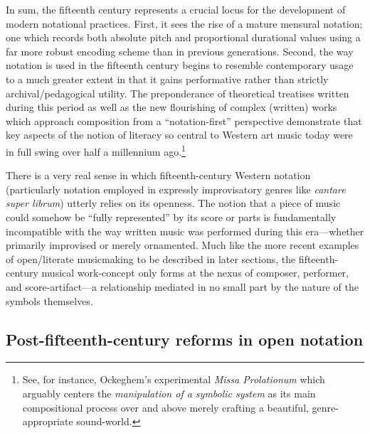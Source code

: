     In sum, the fifteenth century represents a crucial locus for the development of modern notational practices. First, it sees the rise of a mature mensural notation; one which records both absolute pitch and proportional durational values using a far more robust encoding scheme than in previous generations. Second, the way notation is used in the fifteenth century begins to resemble contemporary usage to a much greater extent in that it gains performative rather than strictly archival/pedagogical utility. The preponderance of theoretical treatises written during this period as well as the new flourishing of complex (written) works which approach composition from a ``notation-first'' perspective demonstrate that key aspects of the notion of literacy so central to Western art music today were in full swing over half a millennium ago.\footnote{See, for instance, Ockeghem's experimental \textit{Missa Prolationum} which arguably centers the \textit{manipulation of a symbolic system} as its main compositional process over and above merely crafting a beautiful, genre-appropriate sound-world.} 

    There is a very real sense in which fifteenth-century Western notation (particularly notation employed in expressly improvisatory genres like \textit{cantare super librum}) utterly relies on its openness. The notion that a piece of music could somehow be ``fully represented'' by its score or parts is fundamentally incompatible with the way written music was performed during this era---whether primarily improvised or merely ornamented. Much like the more recent examples of open/literate musicmaking to be described in later sections, the fifteenth-century musical work-concept only forms at the nexus of composer, performer, and score-artifact---a relationship mediated in no small part by the nature of the symbols themselves.
    

\subsection{Post-fifteenth-century reforms in open notation}
   
